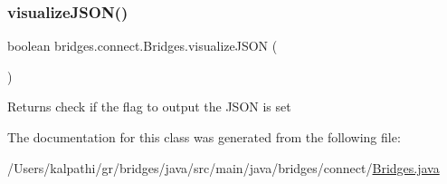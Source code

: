 \subsubsection{\texorpdfstring{visualizeJSON()}{visualizeJSON()}}
{\footnotesize\ttfamily boolean bridges.\+connect.\+Bridges.\+visualize\+J\+S\+ON (\begin{DoxyParamCaption}{ }\end{DoxyParamCaption})}

\begin{DoxyReturn}{Returns}
check if the flag to output the J\+S\+ON is set 
\end{DoxyReturn}


The documentation for this class was generated from the following file\+:\begin{DoxyCompactItemize}
\item 
/\+Users/kalpathi/gr/bridges/java/src/main/java/bridges/connect/\mbox{\hyperlink{_bridges_8java}{Bridges.\+java}}\end{DoxyCompactItemize}
